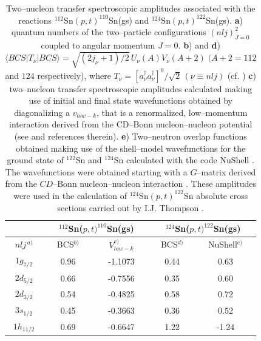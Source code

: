  \begin{table}[h!]
 {\begin{tabular}{|c|c|c|c|c|}
 \cline{2-5} 
 \multicolumn{1}{c|}{ }& \multicolumn{2}{|c|}{ $^{112}$Sn($p,t)^{110}$Sn(gs)}&\multicolumn{2}{|c|}{$^{124}$Sn($p,t)^{122}$Sn(gs)} \\
 \hline
 $nlj^{\,a)}$ & BCS$^{b)}$ & $V_{low-k}^{c)}$ & BCS$^{d)}$& NuShell$^{e)}$  \\
 \hline
 $1g_{7/2}$ & 0.96 &-1.1073 & 0.44 & 0.63  \\
 $2d_{5/2}$ & 0.66 & -0.7556& 0.35 & 0.60  \\
 $2d_{3/2}$ & 0.54 &  -0.4825& 0.58 & 0.72  \\
 $3s_{1/2}$ & 0.45 &  -0.3663&  0.36 & 0.52  \\
 $1h_{11/2}$ & 0.69 & -0.6647 & 1.22 & -1.24  \\
 \hline 
 \end{tabular}}
 \caption{Two--nucleon transfer spectroscopic amplitudes associated with the reactions $^{112}$Sn$(p,t)^{110}$Sn(gs) and $^{124}$Sn$(p,t)^{122}$Sn(gs). \textbf{a}) quantum numbers of the two--particle configurations $(nlj)^2_{J=0}$ coupled to angular momentum $J=0$. \textbf{b}) and \textbf{d}) $\langle BCS|T_\nu|BCS\rangle=\sqrt{(2j_\nu+1)/2}\,U_\nu(A) V_\nu(A+2)\;(A+2=112$ and $ 124$ respectively), where $T_\nu=[a^\dagger_{\nu}a^\dagger_\nu]^0/\sqrt{2} \,(\nu\equiv nlj)$ (cf. \cite{Potel:11,Potel:13,Potel:13b}) \textbf{c}) two--nucleon transfer spectroscopic amplitudes calculated making use of initial and final state wavefunctions obtained by diagonalizing a $v_{low-k}$, that is a renormalized, low--momentum interaction derived from the CD--Bonn nucleon--nucleon potential (see \cite{Guazzoni:06} and references therein). \textbf{e}) Two--neutron overlap functions obtained making use of the shell--model wavefunctions for the ground state of $^{122}$Sn and $^{124}$Sn calculated with the code NuShell \citep{Brown:07}. The wavefunctions were obtained starting with a $G$--matrix derived from the $CD$--Bonn nucleon--nucleon interaction \cite{Machleidt:96}. These amplitudes were used in the calculation of $^{124}$Sn$(p,t)^{122}$Sn absolute cross sections carried out by I.J. Thompson \citep{Thompson:13}.}\label{tab1D1}
 \end{table}
